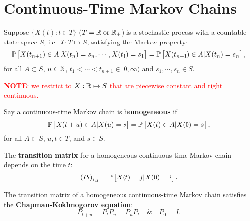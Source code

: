 \section{Continuous-Time Markov Chains}

\begin{definition}
    Suppose $\{X(t): t \in T\}$ ($T = \mathbb{R} \; \text{or} \; \mathbb{R}_+$) is a stochastic process with a countable state space $S$, i.e. $X: T \mapsto S$, satisfying the Markov property:
    \begin{equation*}
        \mathbb{P} \left[ X(t_{n+1}) \in A | X(t_n) = s_n, \cdots, X(t_1) = s_1 \right] = \mathbb{P} \left[ X(t_{n+1}) \in A | X(t_n) = s_n \right],
    \end{equation*}
    for all $A \subset S$, $n \in \mathbb{N}$, $t_1 < \cdots < t_{n+1} \in [0, \infty)$ and $s_1, \cdots, s_n \in S$.
\end{definition}

    \textcolor{red}{\textbf{NOTE}: we restrict to $X: \mathbb{R} \mapsto S$ that are piecewise constant and right continuous.}

\begin{definition}[Homegeneity]
    Say a continuous-time Markov chain is \textbf{homogeneous} if 
    \begin{equation*}
        \mathbb{P} \left[ X(t+u) \in A | X(u) = s \right] = \mathbb{P} \left[ X(t) \in A | X(0) = s \right],
    \end{equation*}
    for all $A \subset S$, $u, t \in T$, and $s \in S$.
\end{definition}

\begin{definition}
    The \textbf{transition matrix} for a homogeneous continuous-time Markov chain depends on the time $t$:
    \begin{equation*}
        \left( P_t \right)_{i,j} = \mathbb{P} \left[ X(t) = j | X(0) = i \right].
    \end{equation*}
\end{definition}

\begin{theorem}
    The transition matrix of a homogeneous continuous-time Markov chain satisfies the \textbf{Chapman-Koklmogorov equation}:
    \begin{equation*}
        P_{t+u} = P_t P_u = P_u P_t \quad \& \quad P_0 = I.
    \end{equation*}
\end{theorem}

